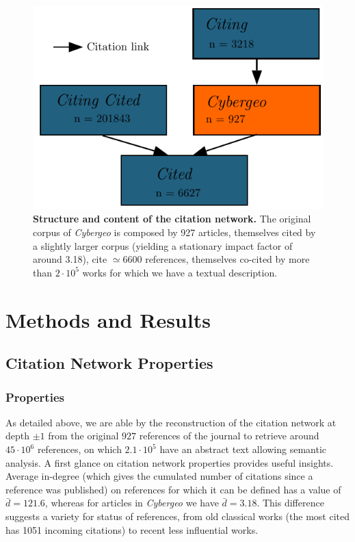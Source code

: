 \begin{figure}
\centering
\includegraphics[width=\textwidth]{figures/Fig2.pdf}
\caption{\textbf{Structure and content of the citation network.} The original corpus of \emph{Cybergeo} is composed by 927 articles, themselves cited by a slightly larger corpus (yielding a stationary impact factor of around 3.18), cite $\simeq 6600$ references, themselves co-cited by more than $2\cdot 10^5$ works for which we have a textual description.}
\label{fig:citationnetwork}
\end{figure}









\section*{Methods and Results}
\label{sec:results}



\subsection*{Citation Network Properties}

\subsubsection*{Properties}


As detailed above, we are able by the reconstruction of the citation network at depth $\pm 1$ from the original $927$ references of the journal to retrieve around $45\cdot 10^6$ references, on which $2.1\cdot 10^5$ have an abstract text allowing semantic analysis. A first glance on citation network properties provides useful insights. Average in-degree (which gives the cumulated number of citations since a reference was published) on references for which it can be defined has a value of $\bar{d}=121.6$, whereas for articles in \textit{Cybergeo} we have $\bar{d}=3.18$. This difference suggests a variety for status of references, from old classical works (the most cited has 1051 incoming citations) to recent less influential works.


